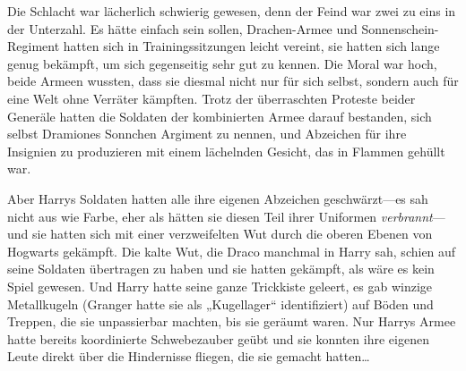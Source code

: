 Die Schlacht war lächerlich schwierig gewesen, denn der Feind war zwei zu eins in der Unterzahl. Es hätte einfach sein sollen, Drachen-Armee und Sonnenschein-Regiment hatten sich in Trainingssitzungen leicht vereint, sie hatten sich lange genug bekämpft, um sich gegenseitig sehr gut zu kennen. Die Moral war hoch, beide Armeen wussten, dass sie diesmal nicht nur für sich selbst, sondern auch für eine Welt ohne Verräter kämpften. Trotz der überraschten Proteste beider Generäle hatten die Soldaten der kombinierten Armee darauf bestanden, sich selbst Dramiones Sonnchen Argiment zu nennen, und Abzeichen für ihre Insignien zu produzieren mit einem lächelnden Gesicht, das in Flammen gehüllt war.

Aber Harrys Soldaten hatten alle ihre eigenen Abzeichen geschwärzt—es sah nicht aus wie Farbe, eher als hätten sie diesen Teil ihrer Uniformen \emph{verbrannt}—und sie hatten sich mit einer verzweifelten Wut durch die oberen Ebenen von Hogwarts gekämpft. Die kalte Wut, die Draco manchmal in Harry sah, schien auf seine Soldaten übertragen zu haben und sie hatten gekämpft, als wäre es kein Spiel gewesen. Und Harry hatte seine ganze Trickkiste geleert, es gab winzige Metallkugeln (Granger hatte sie als „Kugellager“ identifiziert) auf Böden und Treppen, die sie unpassierbar machten, bis sie geräumt waren. Nur Harrys Armee hatte bereits koordinierte Schwebezauber geübt und sie konnten ihre eigenen Leute direkt über die Hindernisse fliegen, die sie gemacht hatten…


